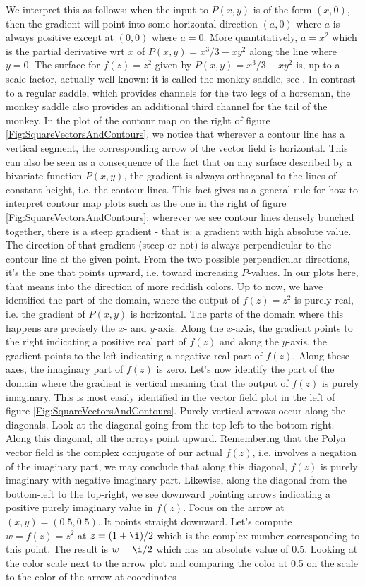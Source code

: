 \documentclass[12pt]{article}
\begin{document}
We interpret this as follows: when the input to $P(x,y)$ is of the form $(x,0)$, then the gradient will point into some horizontal direction $(a,0)$ where $a$ is always positive except at $(0,0)$ where $a=0$. More quantitatively, $a=x^2$ which is the partial derivative wrt $x$ of $P(x,y) = x^3/3 - x y^2$ along the line where $y=0$. The surface for $f(z) = z^2$ given by $P(x,y) = x^3/3 - x y^2$ is, up to a scale factor, actually well known: it is called the monkey saddle, see \cite{MonkeySaddleWiki}. In contrast to a regular saddle, which provides channels for the two legs of a horseman, the monkey saddle also provides an additional third channel for the tail of the monkey. In the plot of the contour map on the right of figure \ref{Fig:SquareVectorsAndContours}, we notice that wherever a contour line has a vertical segment, the corresponding arrow of the vector field is horizontal. This can also be seen as a consequence of the fact that on any surface described by a bivariate function $P(x,y)$, the gradient is always orthogonal to the lines of constant height, i.e. the contour lines. This fact gives us a general rule for how to interpret contour map plots such as the one in the right of figure \ref{Fig:SquareVectorsAndContours}: wherever we see contour lines densely bunched together, there is a steep gradient - that is: a gradient with high absolute value. The direction of that gradient (steep or not) is always perpendicular to the contour line at the given point. From the two possible perpendicular directions, it's the one that points upward, i.e. toward increasing $P$-values. In our plots here, that means into the direction of more reddish colors. Up to now, we have identified the part of the domain, where the output of $f(z) = z^2$ is purely real, i.e. the gradient of $P(x,y)$ is horizontal. The parts of the domain where this happens are precisely the $x$- and $y$-axis. Along the $x$-axis, the gradient points to the right indicating a positive real part of $f(z)$ and along the $y$-axis, the gradient points to the left indicating a negative real part of $f(z)$. Along these axes, the imaginary part of $f(z)$ is zero. Let's now identify the part of the domain where the gradient is vertical meaning that the output of $f(z)$ is purely imaginary. This is most easily identified in the vector field plot in the left of figure \ref{Fig:SquareVectorsAndContours}. Purely vertical arrows occur along the diagonals. Look at the diagonal going from the top-left to the bottom-right. Along this diagonal, all the arrays point upward. Remembering that the Polya vector field is the complex conjugate of our actual $f(z)$, i.e. involves a negation of the imaginary part, we may conclude that along this diagonal, $f(z)$ is purely imaginary with negative imaginary part. Likewise, along the diagonal from the bottom-left to the top-right, we see downward pointing arrows indicating a positive purely imaginary value in $f(z)$. Focus on the arrow at $(x,y) = (0.5,0.5)$. It points straight downward. Let's compute $w = f(z) = z^2$ at $z = (1 + \i) / 2$ which is the complex number corresponding to this point. The result is $w = \i / 2$ which has an absolute value of $0.5$. Looking at the color scale next to the arrow plot and comparing the color at 0.5 on the scale to the color of the arrow at coordinates 
\end{document}
